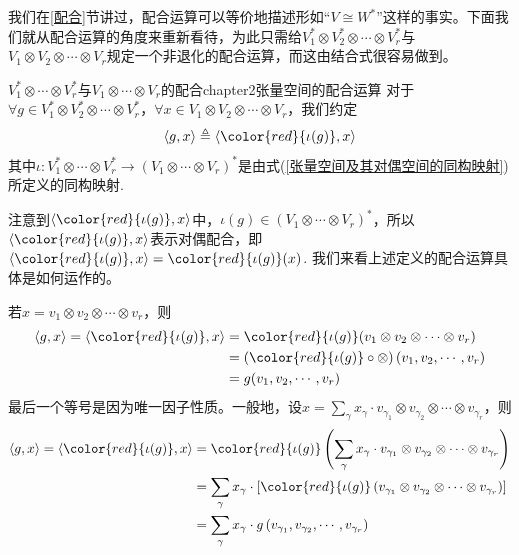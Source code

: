 我们在\ref{配合}节讲过，配合运算可以等价地描述形如“$V\cong W^{\ast}$”这样的事实。下面我们就从配合运算的角度来重新看待，为此只需给$V_{1}^{\ast}\otimes V_{2}^{\ast}\otimes \cdots\otimes V_{r}^{\ast}$与$V_{1}\otimes V_{2}\otimes \cdots\otimes V_{r}$规定一个非退化的配合运算，而这由结合式很容易做到。

\begin{mydef}{$V_{1}^{\ast}\otimes  \cdots\otimes V_{r}^{\ast}$与$V_{1}\otimes \cdots\otimes V_{r}$的配合}{chapter2张量空间的配合运算}
对于$\forall g\in V_{1}^{\ast}\otimes V_{2}^{\ast}\otimes \cdots\otimes V_{r}^{\ast} $，$\forall x\in V_{1}\otimes V_{2}\otimes \cdots\otimes V_{r}$，我们约定
\[
\langle g,x\rangle\triangleq \langle{\color{red}{\iota(g)}},x\rangle
\]
其中$\iota:V_{1}^{\ast}\otimes \cdots\otimes V_{r}^{\ast}\longrightarrow (V_{1}\otimes \cdots\otimes V_{r})^{\ast}$是由式(\ref{张量空间及其对偶空间的同构映射})所定义的同构映射.
\end{mydef}

注意到$\langle{\color{red}{\iota(g)}},x\rangle$中，$\iota(g)\in (V_{1}\otimes \cdots\otimes V_{r})^{\ast}$，所以$\langle{\color{red}{\iota(g)}},x\rangle$表示对偶配合，即$\langle{\color{red}{\iota(g)}},x\rangle={\color{red}{\iota(g)}}(x)$.
我们来看上述定义的配合运算具体是如何运作的。

若$x=v_{1}\otimes v_{2}\otimes \cdots\otimes v_{r}$，则
\begin{equation}
\begin{split}
	\langle g,x\rangle=\langle{\color{red}{\iota(g)}},x\rangle&={\color{red}{\iota(g)}}(v_{1}\otimes v_{2}\otimes \cdots\otimes v_{r})\\
	&=\left({\color{red}{\iota(g)}}\circ \otimes\right)  (v_{1}, v_{2}, \cdots , v_{r})\\
	&=g(v_{1}, v_{2}, \cdots , v_{r})
\end{split}
\label{配合运算1}
\end{equation}
最后一个等号是因为唯一因子性质。一般地，设$x=\sum\limits_{\gamma}x_{\gamma}\cdot  v_{\gamma_{1}}\otimes v_{\gamma_{2}}\otimes\cdots\otimes v_{\gamma_{r}}$，则
\begin{equation}
\begin{split}
	\langle g,x\rangle=\langle{\color{red}{\iota(g)}},x\rangle&={\color{red}{\iota(g)}}\left(\sum_{\gamma}x_{\gamma} \cdot v_{\gamma_{1}}\otimes v_{\gamma_{2}}\otimes\cdots\otimes v_{\gamma_{r}} \right)\\
&=\sum_{\gamma}x_{\gamma} \cdot \left[{\color{red}{\iota(g)}}\left(v_{\gamma_{1}}\otimes v_{\gamma_{2}}\otimes\cdots\otimes v_{\gamma_{r}}\right)\right]\\
&=\sum_{\gamma}x_{\gamma}\cdot  g\left(v_{\gamma_{1}},v_{\gamma_{2}},\cdots, v_{\gamma_{r}}\right)
\end{split}
\label{配合运算2}
\end{equation}

